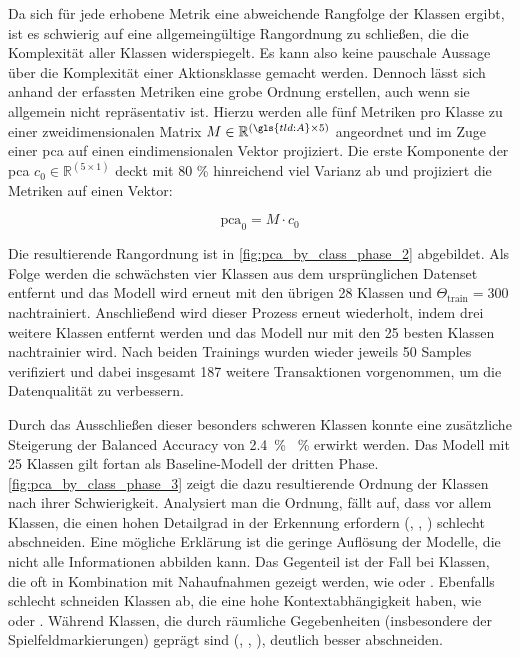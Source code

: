 
Da sich für jede erhobene Metrik eine abweichende Rangfolge der Klassen ergibt, ist es schwierig auf eine allgemeingültige Rangordnung zu schließen, die die Komplexität aller Klassen widerspiegelt.
Es kann also keine pauschale Aussage über die Komplexität einer Aktionsklasse gemacht werden.
Dennoch lässt sich anhand der erfassten Metriken eine grobe Ordnung erstellen, auch wenn sie allgemein nicht repräsentativ ist.
Hierzu werden alle fünf Metriken pro Klasse zu einer zweidimensionalen Matrix $M \in \mathbb{R}^{(\gls{tld:A} \times 5)}$ angeordnet und im Zuge einer \gls{pca} auf einen eindimensionalen Vektor projiziert.
Die erste Komponente der \gls{pca} $c_0 \in \mathbb{R}^{(5 \times 1)}$ deckt mit 80 \% hinreichend viel Varianz ab und projiziert die Metriken auf einen Vektor:

\begin{equation}
    \label{eq:pca}
    \text{pca}_0 = M \cdot c_0
\end{equation}

Die resultierende Rangordnung ist in \autoref{fig:pca_by_class_phase_2} abgebildet.
Als Folge werden die schwächsten vier Klassen aus dem ursprünglichen Datenset entfernt und das Modell wird erneut mit den übrigen 28 Klassen und $\Theta_\text{train} = 300$ nachtrainiert.
Anschließend wird dieser Prozess erneut wiederholt, indem drei weitere Klassen entfernt werden und das Modell nur mit den 25 besten Klassen nachtrainier wird.
Nach beiden Trainings wurden wieder jeweils 50 Samples verifiziert und dabei insgesamt 187 weitere Transaktionen vorgenommen, um die Datenqualität zu verbessern.

Durch das Ausschließen dieser besonders schweren Klassen konnte eine zusätzliche Steigerung der Balanced Accuracy von 2.4~\% ~\% erwirkt werden.
Das Modell mit 25 Klassen gilt fortan als Baseline-Modell der dritten Phase.
\autoref{fig:pca_by_class_phase_3} zeigt die dazu resultierende Ordnung der Klassen nach ihrer Schwierigkeit.
Analysiert man die Ordnung, fällt auf, dass vor allem Klassen, die einen hohen Detailgrad in der Erkennung erfordern (, , ) schlecht abschneiden.
Eine mögliche Erklärung ist die geringe Auflösung der Modelle, die nicht alle Informationen abbilden kann.
Das Gegenteil ist der Fall bei Klassen, die oft in Kombination mit Nahaufnahmen gezeigt werden, wie  oder .
Ebenfalls schlecht schneiden Klassen ab, die eine hohe Kontextabhängigkeit haben, wie  oder .
Während Klassen, die durch räumliche Gegebenheiten (insbesondere der Spielfeldmarkierungen) geprägt sind (, , ), deutlich besser abschneiden.

